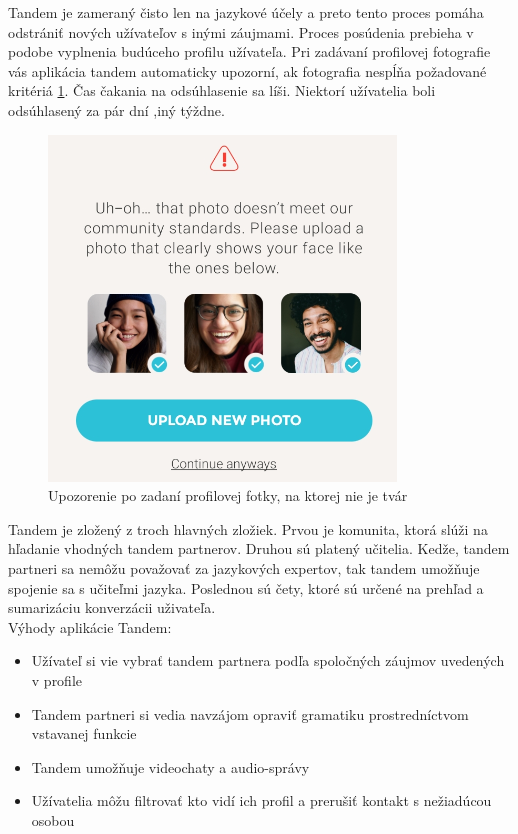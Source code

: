 \documentclass[10pt,oneside,slovak,a4paper]{article}
\begin{document}
 Tandem je zameraný čisto len na jazykové účely a preto tento proces pomáha odstrániť nových užívateľov s inými záujmami. Proces posúdenia prebieha v podobe vyplnenia budúceho profilu užívateľa. Pri zadávaní profilovej fotografie vás aplikácia tandem automaticky upozorní, ak fotografia nespĺňa požadované kritériá \ref{tandem-obmedzenia}. Čas čakania na odsúhlasenie sa líši. Niektorí užívatelia boli odsúhlasený za pár dní ,iný týždne.\\

\begin{figure}[h] %
\centering
\includegraphics{tandem2.png}
\caption{Upozorenie po zadaní profilovej fotky, na ktorej nie je tvár}
\label{tandem-obmedzenia}
\end{figure}

Tandem je zložený z troch hlavných zložiek. Prvou je komunita, ktorá slúži na hľadanie vhodných tandem partnerov. Druhou sú platený učitelia. Kedže, tandem partneri sa nemôžu považovať za jazykových expertov, tak tandem umožňuje spojenie sa s učiteľmi jazyka. Poslednou sú čety, ktoré sú určené na prehľad a sumarizáciu konverzácii uživateľa.
\\

Výhody aplikácie Tandem: 
\begin{itemize}
\item Užívateľ si vie vybrať tandem partnera podľa spoločných záujmov uvedených v profile \cite{tandem}
\item Tandem partneri si vedia navzájom opraviť gramatiku prostredníctvom vstavanej funkcie
\item Tandem umožňuje videochaty \cite{tandem} a audio-správy
\item Užívatelia môžu filtrovať kto vidí ich profil a prerušiť kontakt s nežiadúcou osobou \cite{tandem}
\end{itemize}
\end{document}
